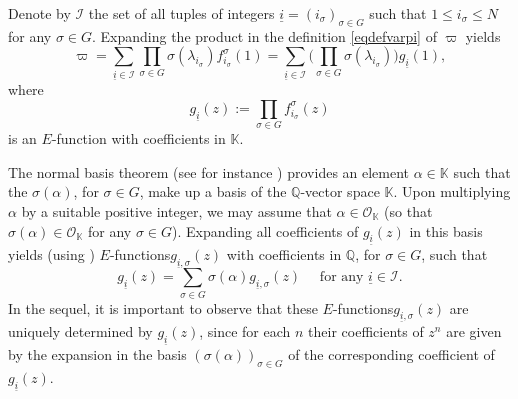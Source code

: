 \documentclass[11pt]{article}
\numberwithin{equation}{section}
\newcommand{\Efunction}{$E$\nobreakdash-func\-tion\xspace}
\newcommand{\Efunctions}{$E$\nobreakdash-func\-tions\xspace}
\theoremstyle{definition}
\newcommand{\Q}{\mathbb{Q}}
\newcommand{\K}{\mathbb{K}}
\newcommand{\Ok}{{\mathcal O}_{\K}}
\newcommand{\calI}{\mathcal I}
\newcommand{\isoul}{{\underline{i}}}
\begin{document}
Denote by $\calI $ the set of all tuples of integers $\isoul = (i_\sigma)_{\sigma\in G}$ such that $1 \leq i_\sigma \leq N$ for any $\sigma\in G$. Expanding the product in the definition \eqref{eqdefvarpi} of $\varpi$ yields
\begin{equation} \label{eqdefvp}
\varpi = \sum_{\isoul\in\calI}
\prod_{\sigma\in G} \sigma(\lambda_{i_\sigma}) f_{i_\sigma}^\sigma(1)
= \sum_{\isoul\in\calI}
\Big( \prod_{\sigma\in G} \sigma(\lambda_{i_\sigma})\Big) g_\isoul(1),
\end{equation}
where
\begin{equation} \label{eqdefgi}
g_\isoul(z) := \prod_{\sigma\in G} f_{i_\sigma}^\sigma(z)
\end{equation}
is an \Efunction with coefficients in $\K$.

The normal basis theorem (see for instance \cite[Th.\,5.18]{Milne}) provides an element $\alpha\in\K$ such that the $\sigma(\alpha)$, for $\sigma\in G$, make up a basis of the $\Q$-vector space $\K$. Upon multiplying $\alpha$ by a suitable positive integer, we may assume that $\alpha\in\Ok$ (so that $\sigma(\alpha)\in\Ok$ for any $\sigma\in G$). Expanding all coefficients of $ g_\isoul(z)$ in this basis yields (using \cite[Ch.\,3, Lem.\,12]{Shidlovskiilivre}) \Efunctions $ g_{\isoul,\sigma}(z)$ with coefficients in $\Q$, for $\sigma\in G$, such that
\begin{equation} \label{eqdcpgi}
g_\isoul(z) = \sum_{\sigma\in G} \sigma(\alpha)g_{\isoul,\sigma}(z)
\quad \mbox{ for any } \isoul\in\calI.
\end{equation}
In the sequel, it is important to observe that these \Efunctions $ g_{\isoul,\sigma}(z)$ are uniquely determined by $ g_\isoul(z)$, since for each $n$ their coefficients of $z^n$ are given by the expansion in the basis $(\sigma(\alpha))_{\sigma\in G}$ of the corresponding coefficient of $ g_\isoul(z)$.
\end{document}
